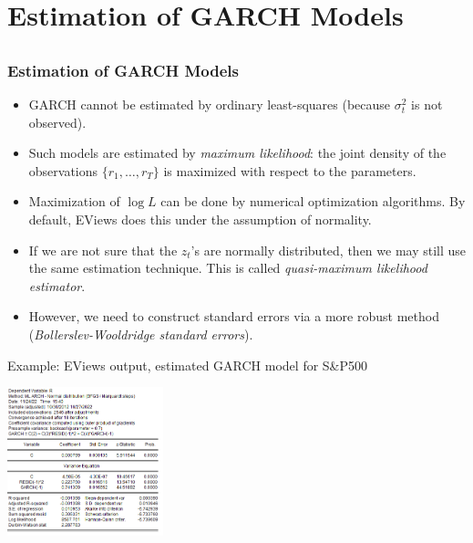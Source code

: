 \section[Estimation]{Estimation of GARCH Models}\subsection*{}
\begin{frame}%

\frametitle{Estimation of GARCH Models}

\begin{itemize}
\item GARCH cannot be estimated by ordinary least-squares (because
$\sigma^2_t$ is not observed).

\item Such models are estimated by \emph{\color{red}maximum likelihood}: the
joint density of the observations $\{r_{1},\ldots ,r_{T}\}$ is maximized
with respect to the parameters.

\item Maximization of $\log L$ can be done by numerical optimization
algorithms. By default, EViews does this under the assumption of normality.

\item If we are not sure that the $z_{t}$'s are normally distributed, then
we may still use the same estimation technique. This is called \emph{%
\color{red}quasi-maximum likelihood estimator}.

\item However, we need to construct standard errors via a more robust method
(\emph{\color{red}Bollerslev-Wooldridge standard errors}).
\end{itemize}

\end{frame}%

\begin{frame}%

\begin{block}{Example: EViews output, estimated GARCH model for S\&P500}
\centerline{\includegraphics[height=1.7in]{sp500_garch}}
\end{block}

\end{frame}%

